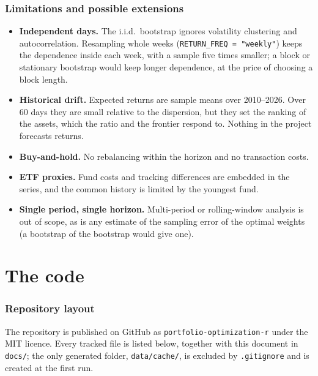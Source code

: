 \documentclass[11pt,a4paper]{article}
\newcommand{\code}[1]{\texttt{#1}}
\newcommand{\file}[1]{\texttt{#1}}
\theoremstyle{plain}
\theoremstyle{remark}
\begin{document}
\section{Limitations and possible extensions}
\label{sec:limits}

\begin{itemize}[nosep]
  \item \textbf{Independent days.} The i.i.d.\ bootstrap ignores volatility
        clustering and autocorrelation. Resampling whole weeks
        (\code{RETURN\_FREQ = "weekly"}) keeps the dependence inside each
        week, with a sample five times smaller; a block or stationary
        bootstrap would keep longer dependence, at the price of choosing a
        block length.
  \item \textbf{Historical drift.} Expected returns are sample means over
        2010--2026. Over 60 days they are small relative to the dispersion,
        but they set the ranking of the assets, which the ratio and the
        frontier respond to. Nothing in the project forecasts returns.
  \item \textbf{Buy-and-hold.} No rebalancing within the horizon and no
        transaction costs.
  \item \textbf{ETF proxies.} Fund costs and tracking differences are
        embedded in the series, and the common history is limited by the
        youngest fund.
  \item \textbf{Single period, single horizon.} Multi-period or
        rolling-window analysis is out of scope, as is any estimate of the
        sampling error of the optimal weights (a bootstrap of the bootstrap
        would give one).
\end{itemize}

\part{The code}
\label{part:code}

\section{Repository layout}
\label{sec:layout}

The repository is published on GitHub as \code{portfolio-optimization-r}
under the MIT licence. Every tracked file is listed below, together with
this document in \file{docs/}; the only generated folder, \file{data/cache/},
is excluded by \file{.gitignore} and is created at the first run.
\end{document}
